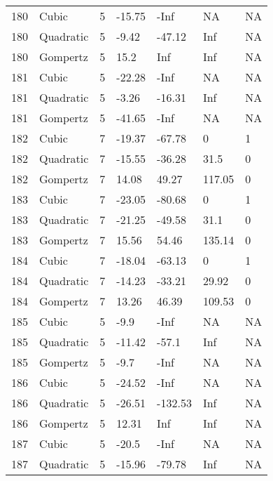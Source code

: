 \documentclass[11pt]{article}
\begin{document}
\begin{center}
\begin{longtable}{lllllll}
    180 & Cubic     & 5               & -15.75  & -Inf    & NA      & NA   \\
    180 & Quadratic & 5               & -9.42   & -47.12  & Inf     & NA   \\
    180 & Gompertz  & 5               & 15.2    & Inf     & Inf     & NA   \\
    181 & Cubic     & 5               & -22.28  & -Inf    & NA      & NA   \\
    181 & Quadratic & 5               & -3.26   & -16.31  & Inf     & NA   \\
    181 & Gompertz  & 5               & -41.65  & -Inf    & NA      & NA   \\
    182 & Cubic     & 7               & -19.37  & -67.78  & 0       & 1    \\
    182 & Quadratic & 7               & -15.55  & -36.28  & 31.5    & 0    \\
    182 & Gompertz  & 7               & 14.08   & 49.27   & 117.05  & 0    \\
    183 & Cubic     & 7               & -23.05  & -80.68  & 0       & 1    \\
    183 & Quadratic & 7               & -21.25  & -49.58  & 31.1    & 0    \\
    183 & Gompertz  & 7               & 15.56   & 54.46   & 135.14  & 0    \\
    184 & Cubic     & 7               & -18.04  & -63.13  & 0       & 1    \\
    184 & Quadratic & 7               & -14.23  & -33.21  & 29.92   & 0    \\
    184 & Gompertz  & 7               & 13.26   & 46.39   & 109.53  & 0    \\
    185 & Cubic     & 5               & -9.9    & -Inf    & NA      & NA   \\
    185 & Quadratic & 5               & -11.42  & -57.1   & Inf     & NA   \\
    185 & Gompertz  & 5               & -9.7    & -Inf    & NA      & NA   \\
    186 & Cubic     & 5               & -24.52  & -Inf    & NA      & NA   \\
    186 & Quadratic & 5               & -26.51  & -132.53 & Inf     & NA   \\
    186 & Gompertz  & 5               & 12.31   & Inf     & Inf     & NA   \\
    187 & Cubic     & 5               & -20.5   & -Inf    & NA      & NA   \\
    187 & Quadratic & 5               & -15.96  & -79.78  & Inf     & NA   \\

\end{longtable}
\end{center}
\end{document}
